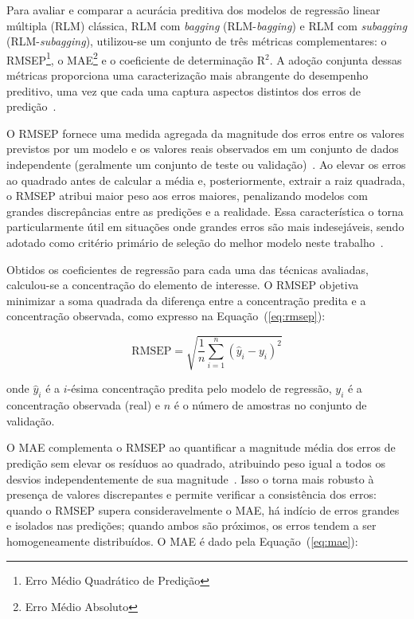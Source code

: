 Para avaliar e comparar a acurácia preditiva dos modelos de regressão 
linear múltipla (RLM) clássica, RLM com \textit{bagging} 
(RLM-\textit{bagging}) e RLM com \textit{subagging} 
(RLM-\textit{subagging}), utilizou-se um conjunto de três métricas 
complementares: o \gls{RMSEP}\footnote{Erro Médio Quadrático de 
Predição}, o \gls{MAE}\footnote{Erro Médio Absoluto} e o coeficiente 
de determinação R$^2$. A adoção conjunta dessas métricas proporciona 
uma caracterização mais abrangente do desempenho preditivo, uma vez 
que cada uma captura aspectos distintos dos erros de 
predição~\cite{Westad2024,kumari2024}.

O \gls{RMSEP} fornece uma medida agregada da magnitude dos erros 
entre os valores previstos por um modelo e os valores reais 
observados em um conjunto de dados independente (geralmente um 
conjunto de teste ou validação)~\cite{Westad2024,kumari2024}. Ao 
elevar os erros ao quadrado antes de calcular a média e, 
posteriormente, extrair a raiz quadrada, o \gls{RMSEP} atribui 
maior peso aos erros maiores, penalizando modelos com grandes 
discrepâncias entre as predições e a realidade. Essa característica 
o torna particularmente útil em situações onde grandes erros são 
mais indesejáveis, sendo adotado como critério primário de seleção 
do melhor modelo neste 
trabalho~\cite{liu2025,perisdiaz2021,jensen2024,Westad2024}.

Obtidos os coeficientes de regressão para cada uma das técnicas 
avaliadas, calculou-se a concentração do elemento de interesse. 
O \gls{RMSEP} objetiva minimizar a soma quadrada da diferença entre a concentração predita e a concentração observada, como expresso na Equação~(\ref{eq:rmsep}):

\begin{equation}
   \textrm{RMSEP} = \sqrt{\dfrac{1}{n}\sum_{i=1}^{n}(\widehat{y}_i-y_i)^2}
\label{eq:rmsep}
\end{equation}

\noindent onde $\widehat{y}_i$ é a $i$-ésima concentração predita 
pelo modelo de regressão, $y_i$ é a concentração observada (real) 
e $n$ é o número de amostras no conjunto de validação.

O \gls{MAE} complementa o \gls{RMSEP} ao quantificar a magnitude 
média dos erros de predição sem elevar os resíduos ao quadrado, 
atribuindo peso igual a todos os desvios independentemente de sua 
magnitude~\cite{hodson2022rmse}. Isso o torna mais robusto 
à presença de valores discrepantes e permite verificar a 
consistência dos erros: quando o \gls{RMSEP} supera 
consideravelmente o \gls{MAE}, há indício de erros grandes e 
isolados nas predições; quando ambos são próximos, os erros tendem 
a ser homogeneamente distribuídos. O \gls{MAE} é dado pela Equação~(\ref{eq:mae}):

